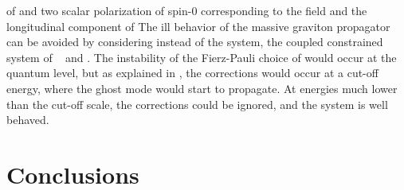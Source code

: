 \documentclass[a4paper,12pt]{article}
\begin{document}
of \coordHE{} and two scalar polarization of spin-0 corresponding to the field
\myHighlight{$\varphi$}\coordHE{} and the longitudinal component of \coordHE{} The ill behavior of the
massive graviton propagator can be avoided by considering instead of the
\coordHE{}  \coordHE{} system, the coupled constrained system of
\myHighlight{$\ $}\coordHE{}\ \coordHE{}  \coordHE{}  \myHighlight{$\varphi$}\coordHE{} and \coordHE{}. The instability of
the Fierz-Pauli choice of \coordHE{} would occur at the quantum level, but as
explained in \cite{ags}, the corrections would occur at a cut-off energy,
where the ghost mode would start to propagate. At energies much lower than the
cut-off scale, the corrections could be ignored, and the system is well behaved.

\section{Conclusions}
\end{document}
